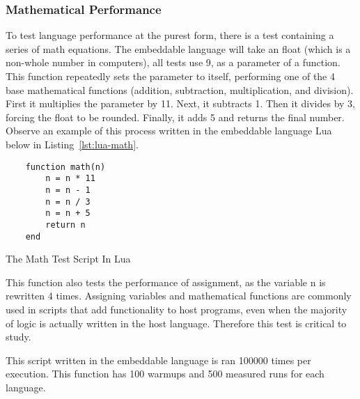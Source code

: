 \subsubsection{Mathematical Performance}
To test language performance at the purest form, there is a test containing a series of math equations. The embeddable language will take an float (which is a non-whole number in computers), all tests use 9, as a parameter of a function. This function repeatedly sets the parameter to itself, performing one of the 4 base mathematical functions (addition, subtraction, multiplication, and division). First it multiplies the parameter by 11. Next, it subtracts 1. Then it divides by 3, forcing the float to be rounded. Finally, it adds 5 and returns the final number. Observe an example of this process written in the embeddable language Lua below in Listing~\ref{lst:lua-math}.

\begin{listing}[H]
    \begin{verbatim}
    function math(n)
        n = n * 11
        n = n - 1
        n = n / 3
        n = n + 5
        return n
    end
    \end{verbatim}
    \caption{The Math Test Script In Lua}
    \label{lst:lua-math}
\end{listing}

This function also tests the performance of assignment, as the variable n is rewritten 4 times. Assigning variables and mathematical functions are commonly used in scripts that add functionality to host programs, even when the majority of logic is actually written in the host language. Therefore this test is critical to study.

This script written in the embeddable language is ran 100000 times per execution. This function has 100 warmups and 500 measured runs for each language.
